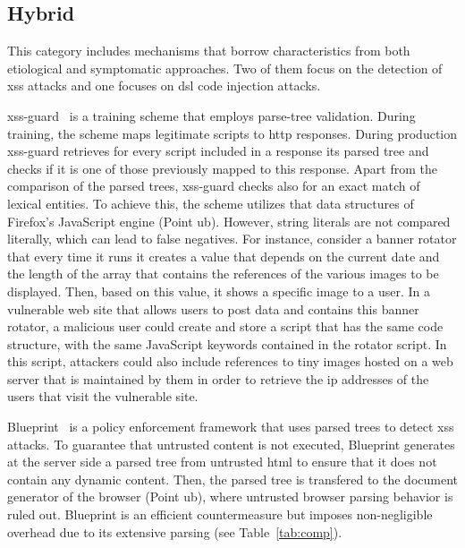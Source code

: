 \documentclass[conference]{IEEEtran}
\begin{document}
\subsection{Hybrid}
\label{sec:hybrid}

This category includes mechanisms that borrow
characteristics from both etiological and symptomatic approaches.
Two of them focus on the detection of {\sc xss}
attacks and one focuses on {\sc dsl} code injection attacks.

{\sc xss-guard}~\cite{BV08} is a training scheme that employs
parse-tree validation. During training, the scheme maps legitimate
scripts to {\sc http} responses. During production {\sc xss-guard}
retrieves for every script included in a response its parsed tree and
checks if it is one of those previously mapped to this response. Apart
from the comparison of the parsed trees, {\sc xss-guard} checks also
for an exact match of lexical entities. To achieve this, the scheme
utilizes that data structures of Firefox's JavaScript engine (Point
{\sc ub}). However, string literals are not compared literally, which
can lead to false negatives. For instance, consider a banner rotator
that every time it runs it creates a value that depends on the
current date and the length of the array that contains the references
of the various images to be displayed. Then, based on this value, it
shows a specific image to a user. In a vulnerable web site that allows
users to post data and contains this banner rotator, a malicious user
could create and store a script that has the same code structure, with
the same JavaScript keywords contained in the rotator script.
In this script, attackers could also include references to tiny
images hosted on a web server that is maintained by them in order to
retrieve the {\sc ip} addresses of the users that visit the vulnerable
site.

Blueprint~\cite{LV09} is a policy enforcement framework that
uses parsed trees to detect {\sc xss} attacks. To guarantee
that untrusted content is not executed, Blueprint generates at the
server side a parsed tree from untrusted {\sc html} to ensure that it
does not contain any dynamic content. Then, the parsed tree is
transfered to the document generator of the browser (Point {\sc ub}),
where untrusted browser parsing behavior is ruled out.
Blueprint is an efficient countermeasure but imposes non-negligible
overhead due to its extensive parsing (see Table~\ref{tab:comp}).
\end{document}
